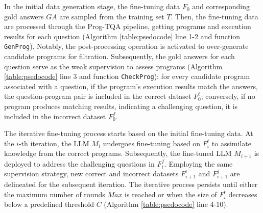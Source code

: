 \documentclass[10pt, a4paper]{article}
\begin{document}
In the initial data generation stage, the fine-tuning data $F_0$ and corresponding gold answers $GA$ are sampled from the training set $T$. Then, the fine-tuning data are processed through the Prog-TQA pipeline, getting programs and execution results for each question (Algorithm \ref{table:psedocode} line
1-2 and function \verb|GenProg|). Notably, the post-processing operation is activated to over-generate candidate programs for filtration. Subsequently, the gold answers for each question serve as the weak supervision to assess programs (Algorithm \ref{table:psedocode} line
3 and function \verb|CheckProg|): for every candidate program associated with a question, if the program's execution results match the answers, the question-program pair is included in the correct dataset $F^t_0$; conversely, if no program produces matching results, indicating a challenging question, it is included in the incorrect dataset $F^f_0$.

The iterative fine-tuning process starts based on the initial fine-tuning data.  At the $i$-th iteration, the LLM ${M}_i$ undergoes fine-tuning based on $F^t_i$ to assimilate knowledge from the correct programs. Subsequently, the fine-tuned LLM ${M}_{i+1}$ is deployed to address the challenging questions in $F^f_i$. Employing the same supervision strategy, new correct and incorrect datasets $F^t_{i+1}$ and $F^f_{i+1}$ are delineated for the subsequent iteration. The iterative process persists until either the maximum number of rounds $Max$ is reached or when the size of $F^t_{i}$ decreases below a predefined threshold $C$ (Algorithm \ref{table:psedocode} line
4-10).  
\end{document}
